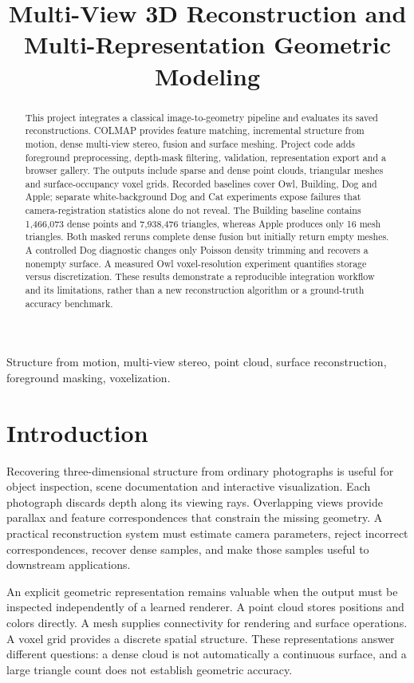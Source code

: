 \documentclass[conference]{IEEEtran}
\title{Multi-View 3D Reconstruction and Multi-Representation Geometric Modeling}
\author{
\IEEEauthorblockN{Kothapally Anjan Reddy \qquad Babhale Rohan Laxmikant}
\IEEEauthorblockA{23bcs071: \href{mailto:23bcs071@iiitdwd.ac.in}{23bcs071@iiitdwd.ac.in} \qquad 23bcs026: \href{mailto:23bcs026@iiitdwd.ac.in}{23bcs026@iiitdwd.ac.in}}
\vspace{2mm}
\IEEEauthorblockN{Gujja Sri Varshith Rao \qquad Koushik C}
\IEEEauthorblockA{23bcs051: \href{mailto:23bcs051@iiitdwd.ac.in}{23bcs051@iiitdwd.ac.in} \qquad 23bcs073: \href{mailto:23bcs073@iiitdwd.ac.in}{23bcs073@iiitdwd.ac.in}}}
\begin{document}
\maketitle
\begin{abstract}
This project integrates a classical image-to-geometry pipeline and evaluates its saved reconstructions. COLMAP provides feature matching, incremental structure from motion, dense multi-view stereo, fusion and surface meshing. Project code adds foreground preprocessing, depth-mask filtering, validation, representation export and a browser gallery. The outputs include sparse and dense point clouds, triangular meshes and surface-occupancy voxel grids. Recorded baselines cover Owl, Building, Dog and Apple; separate white-background Dog and Cat experiments expose failures that camera-registration statistics alone do not reveal. The Building baseline contains 1,466,073 dense points and 7,938,476 triangles, whereas Apple produces only 16 mesh triangles. Both masked reruns complete dense fusion but initially return empty meshes. A controlled Dog diagnostic changes only Poisson density trimming and recovers a nonempty surface. A measured Owl voxel-resolution experiment quantifies storage versus discretization. These results demonstrate a reproducible integration workflow and its limitations, rather than a new reconstruction algorithm or a ground-truth accuracy benchmark.
\end{abstract}
\begin{IEEEkeywords}
Structure from motion, multi-view stereo, point cloud, surface reconstruction, foreground masking, voxelization.
\end{IEEEkeywords}

\section{Introduction}
Recovering three-dimensional structure from ordinary photographs is useful for object inspection, scene documentation and interactive visualization. Each photograph discards depth along its viewing rays. Overlapping views provide parallax and feature correspondences that constrain the missing geometry. A practical reconstruction system must estimate camera parameters, reject incorrect correspondences, recover dense samples, and make those samples useful to downstream applications.

An explicit geometric representation remains valuable when the output must be inspected independently of a learned renderer. A point cloud stores positions and colors directly. A mesh supplies connectivity for rendering and surface operations. A voxel grid provides a discrete spatial structure. These representations answer different questions: a dense cloud is not automatically a continuous surface, and a large triangle count does not establish geometric accuracy.
\end{document}

